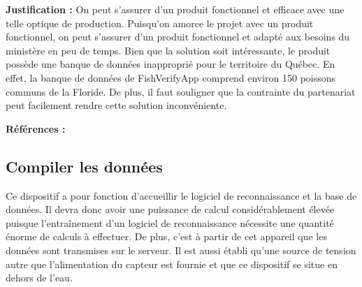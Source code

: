 \textbf{Justification :} On peut s’assurer d’un produit fonctionnel et efficace avec une telle optique de production. Puisqu’on amorce le projet avec un produit fonctionnel, on peut s’assurer d’un produit fonctionnel et adapté aux besoins du ministère en peu de temps. Bien que la solution soit intéressante, le produit possède une banque de données inapproprié pour le territoire du Québec. En effet, la banque de données de FishVerifyApp comprend environ 150 poissons communs de la Floride. De plus, il faut souligner que la contrainte du partenariat peut facilement rendre cette solution inconvéniente.


\textbf{Références :} \cite{fishverify}




\begin{table}[!htb]
\footnotesize
\centering
{}
\caption{Faisabilité des concepts pour identifier les poissons et compiler les données}
\label{t:Decision_identifier}
\end{table}


\subsection{Compiler les données}
Ce dispositif a pour fonction d'accueillir le logiciel de reconnaissance et la base de données. Il devra donc avoir une puissance de calcul considérablement élevée puisque l'entraînement d'un logiciel de reconnaissance nécessite une quantité énorme de calculs à effectuer. De plus, c'est à partir de cet appareil que les données sont transmises sur le serveur. Il est aussi établi qu'une source de tension autre que l'alimentation du capteur est fournie et que ce dispositif se situe en dehors de l'eau. \vspace{5mm}


